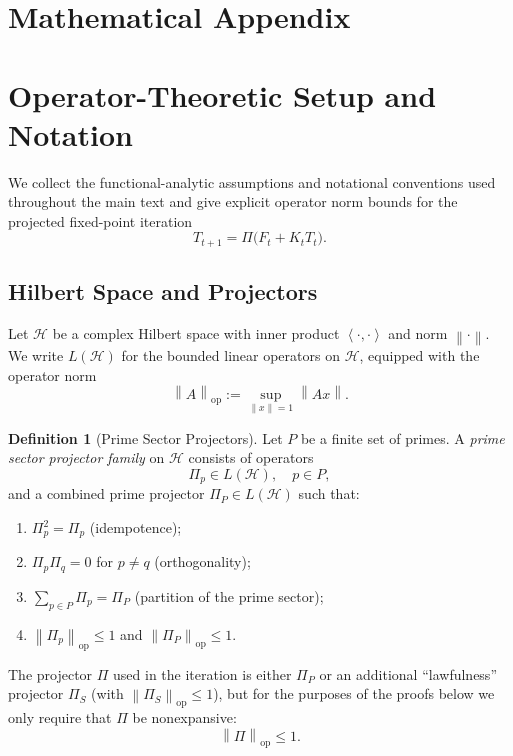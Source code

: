 \documentclass[11pt]{article}
\theoremstyle{definition}
\newtheorem{definition}{Definition}[section]
\theoremstyle{plain}
\theoremstyle{remark}
\newcommand{\Hcal}{\mathcal{H}}
\newcommand{\norm}[1]{\left\lVert #1 \right\rVert}
\newcommand{\ip}[2]{\left\langle #1, #2 \right\rangle}
\begin{document}
\appendix
\section*{Mathematical Appendix}

\section{Operator-Theoretic Setup and Notation}

We collect the functional-analytic assumptions and notational conventions used throughout the main text and give explicit operator norm bounds for the projected fixed-point iteration
\[
  T_{t+1} = \Pi\bigl(F_t + K_t T_t\bigr).
\]

\subsection{Hilbert Space and Projectors}

Let \(\Hcal\) be a complex Hilbert space with inner product \(\ip{\cdot}{\cdot}\) and norm \(\norm{\cdot}\).
We write \(L(\Hcal)\) for the bounded linear operators on \(\Hcal\), equipped with the operator norm
\[
  \norm{A}_{\mathrm{op}} := \sup_{\norm{x}=1} \norm{Ax}.
\]

\begin{definition}[Prime Sector Projectors]
Let \(P\) be a finite set of primes.
A \emph{prime sector projector family} on \(\Hcal\) consists of operators
\[
  \Pi_p \in L(\Hcal),\quad p \in P,
\]
and a combined prime projector \(\Pi_P \in L(\Hcal)\) such that:
\begin{enumerate}
  \item \(\Pi_p^2 = \Pi_p\) (idempotence);
  \item \(\Pi_p \Pi_q = 0\) for \(p \neq q\) (orthogonality);
  \item \(\sum_{p\in P} \Pi_p = \Pi_P\) (partition of the prime sector);
  \item \(\norm{\Pi_p}_{\mathrm{op}} \le 1\) and \(\norm{\Pi_P}_{\mathrm{op}} \le 1\).
\end{enumerate}
\end{definition}

The projector \(\Pi\) used in the iteration is either \(\Pi_P\) or an additional ``lawfulness'' projector \(\Pi_S\) (with \(\norm{\Pi_S}_{\mathrm{op}}\le 1\)), but for the purposes of the proofs below we only require that \(\Pi\) be nonexpansive:
\[
  \norm{\Pi}_{\mathrm{op}} \le 1.
\]
\end{document}

